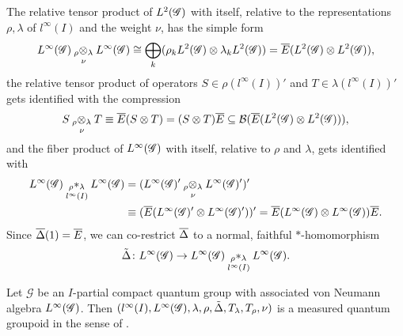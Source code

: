 The relative tensor product of $L^{2}(\mathscr{G})$ with itself, relative to the
representations $\rho,\lambda$ of $l^{\infty}(I)$ and the weight
$\nu$, has the simple form
\begin{align*}
L^{\infty}(\mathscr{G}) \underset{\nu{}}{_{\rho}\otimes_{\lambda}} L^{\infty}(\mathscr{G}) \cong
  \bigoplus_{k} (\rho_{k}L^{2}(\mathscr{G}) \otimes \lambda_{k}L^{2}(\mathscr{G})) =
  \overline{E}(L^{2}(\mathscr{G}) \otimes L^{2}(\mathscr{G})),
\end{align*}
the relative tensor product of operators $S\in \rho(l^{\infty}(I))'$
and $T \in \lambda(l^{\infty}(I))'$ gets identified with the
compression
\begin{align*}
S \underset{\nu{}}{_{\rho}\otimes_{\lambda}} T \equiv
  \overline{E}(S \otimes
  T) = (S \otimes T)\overline{E} \subseteq {\cal B}(\overline{E}(L^{2}(\mathscr{G})
  \otimes L^{2}(\mathscr{G}))),
\end{align*}
and the fiber product of  $  L^{\infty}(\mathscr{G})$ with itself, relative to $\rho$
and $\lambda$,  gets identified with
\begin{align} \label{eq:vn-fiber}
  \begin{aligned}
    L^{\infty}(\mathscr{G}) \underset{l^{\infty}(I)}{_{\rho}\ast_{\lambda}} L^{\infty}(\mathscr{G}) &= (L^{\infty}(\mathscr{G})' \underset{\nu{}}{_{\rho}\otimes_{\lambda}} L^{\infty}(\mathscr{G})')' \\ &\equiv
    (\overline{E}(L^{\infty}(\mathscr{G})' \otimes L^{\infty}(\mathscr{G})'))' = \overline{E}(L^{\infty}(\mathscr{G}) \otimes
    L^{\infty}(\mathscr{G}))\overline{E}.
  \end{aligned}
\end{align} 
Since $\overline{\Delta}(1)=\overline{E}$, we can co-restrict $\overline{\Delta}$ to  a
normal, faithful $*$-homomorphism
\begin{align*}
  \tilde\Delta \colon L^{\infty}(\mathscr{G}) \to   L^{\infty}(\mathscr{G}) \underset{l^{\infty}(I)}{_{\rho}\ast_{\lambda}} L^{\infty}(\mathscr{G}).
\end{align*}
\begin{Theorem}
  Let $\mathscr{G}$ be an $I$-partial compact quantum group with
  associated von Neumann algebra $L^{\infty}(\mathscr{G})$.  Then
  $(l^{\infty}(I),L^{\infty}(\mathscr{G}), \lambda,\rho,\tilde\Delta,
  T_{\lambda},T_{\rho},\nu)$ is a measured quantum groupoid in the
  sense of \cite{Eno2}.
\end{Theorem}
